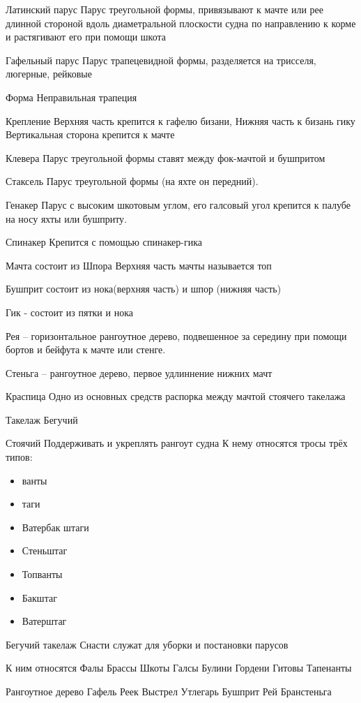 \documentclass{article}        %
\begin{document}
Латинский парус
Парус треугольной формы, привязывают к мачте или рее длинной стороной вдоль диаметральной плоскости судна по направлению к корме и растягивают его при помощи шкота

Гафельный парус
Парус трапецевидной формы, разделяется на трисселя, люгерные, рейковые

Форма
Неправильная трапеция

Крепление
Верхняя часть крепится к гафелю бизани, 
Нижняя часть к бизань гику
Вертикальная сторона крепится к мачте

Клевера
Парус треугольной формы ставят между фок-мачтой и бушпритом


Стаксель
Парус треугольной формы (на яхте он передний).

Генакер
Парус с высоким шкотовым углом, его галсовый угол крепится к палубе на носу яхты или бушприту.

Спинакер
Крепится с помощью спинакер-гика

Мачта состоит из 
Шпора
Верхняя часть мачты называется топ

Бушприт состоит из нока(верхняя часть) и шпор (нижняя часть)

Гик - состоит из пятки и нока


Рея -- горизонтальное рангоутное дерево, подвешенное за середину при помощи бортов и бейфута к мачте или стенге.

Стеньга -- рангоутное дерево, первое удлиннение нижних мачт

Краспица
Одно из основных средств распорка между мачтой стоячего такелажа



Такелаж
Бегучий

Стоячий
Поддерживать и укреплять рангоут судна
К нему относятся тросы трёх типов:
\begin{itemize}
\item ванты
\item таги
\item Ватербак штаги
\item Стеньштаг
\item Топванты
\item Бакштаг
\item Ватерштаг
\end{itemize}

Бегучий такелаж
Снасти служат для уборки и постановки парусов

К ним относятся
Фалы
Брассы
Шкоты
Галсы
Булини
Гордени
Гитовы
Тапенанты


Рангоутное дерево
Гафель
Реек
Выстрел
Утлегарь
Бушприт
Рей
Бранстеньга
\end{document}
